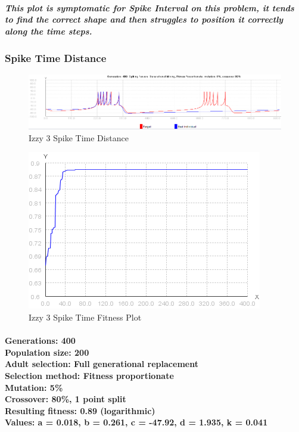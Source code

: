 \documentclass[titlepage,norsk]{article}
\begin{document}
\subparagraph{This plot is symptomatic for Spike Interval on this problem, it tends to find the correct shape and then struggles to position it correctly along the time steps.}

\subsubsection{Spike Time  Distance}

\begin{figure}[h!]
\centering
\includegraphics[scale=0.75]{izzy3spike.png}
\caption{Izzy 3 Spike Time Distance}
\label{fig:awesome_image}
\end{figure}

\begin{figure}[h!]
\centering
\includegraphics[scale=0.75]{izzy3spikeFitness.png}
\caption{Izzy 3 Spike Time Fitness Plot}
\label{fig:awesome_image}
\end{figure}

\paragraph{
Generations: 400\\
Population size: 200\\
Adult selection: Full generational replacement \\
Selection method: Fitness proportionate\\
Mutation: 5\% \\
Crossover: 80\%, 1 point split \\
Resulting fitness: 0.89 (logarithmic) \\
Values: a = 0.018, b = 0.261, c = -47.92, d = 1.935, k = 0.041 \\
}
\end{document}
